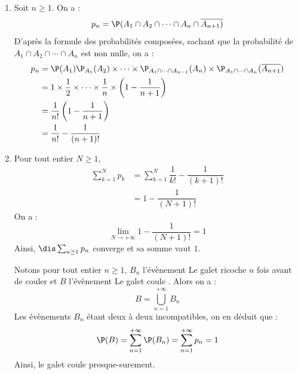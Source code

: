 \documentclass[a4paper,10pt]{report}
\begin{document}
\begin{enumerate}
\item Soit $n \geq 1$. On a :
$$ p_n = \P(A_1 \cap A_2 \cap \cdots \cap A_n \cap \overline{A_{n+1})}$$
D'après la formule des probabilités composées, sachant que la probabilité de $A_1 \cap A_2 \cap \cdots \cap A_n $ est non nulle, on a :
\begin{align*}
p_n & = \P(A_1) \P_{A_1}(A_2) \times \cdots \times \P_{A_1 \cap \cdots \cap A_{n-1}}(A_n) \times \P_{A_1 \cap \cdots \cap A_{n}}(\overline{A_{n+1}}) \\
& = 1 \times \dfrac{1}{2} \times \cdots \times \dfrac{1}{n} \times \left(1- \dfrac{1}{n+1} \right) \\
& = \dfrac{1}{n!} \left(1- \dfrac{1}{n+1} \right) \\
& = \dfrac{1}{n!} - \dfrac{1}{(n+1)!}
\end{align*}
\item Pour tout entier $N \geq 1$,
\begin{align*}
\sum_{k=1}^N p_k & = \sum_{k=1}^N \dfrac{1}{k!} - \dfrac{1}{(k+1)!} \\
& = 1- \dfrac{1}{(N+1)!}
\end{align*}
On a :
$$ \lim_{N \rightarrow + \infty}  1- \dfrac{1}{(N+1)!} = 1$$
Ainsi, $\dis \sum_{n \geq 1} p_n$ converge et sa somme vaut $1$.

\medskip

\noindent Notons pour tout entier $n \geq 1$, $B_n$ l'évènement \og Le galet ricoche $n$ fois avant de couler \fg et $B$ l'évènement \og Le galet coule \fg{}. Alors on a :
$$ B = \bigcup_{n=1}^{+ \infty} B_n$$
Les évènements $B_n$ étant deux à deux incompatibles, on en déduit que :
$$ \P(B) = \sum_{n=1}^{+ \infty} \P(B_n) =  \sum_{n=1}^{+ \infty} p_n = 1$$
Ainsi, le galet coule presque-surement.
\end{enumerate}
\end{document}
